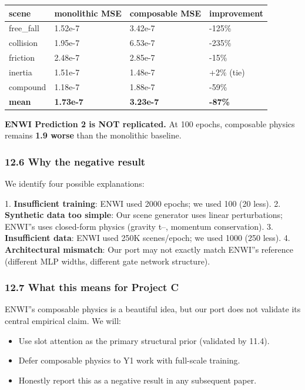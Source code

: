 \documentclass[11pt]{article}
\begin{document}
\begin{tabular}{llll}
scene & monolithic MSE & composable MSE & improvement \\
\hline
free\_fall & 1.52e-7 & 3.42e-7 & -125\% \\
collision & 1.95e-7 & 6.53e-7 & -235\% \\
friction & 2.48e-7 & 2.85e-7 & -15\% \\
inertia & 1.51e-7 & 1.48e-7 & +2\% (tie) \\
compound & 1.18e-7 & 1.88e-7 & -59\% \\
\textbf{mean} & \textbf{1.73e-7} & \textbf{3.23e-7} & \textbf{-87\%} \\
\end{tabular}


\textbf{ENWI Prediction 2 is NOT replicated.} At 100 epochs, composable physics
remains \textbf{1.9 worse} than the monolithic baseline.

\subsubsection{12.6 Why the negative result}

We identify four possible explanations:

1. \textbf{Insufficient training}: ENWI used 2000 epochs; we used 100 (20 less).
2. \textbf{Synthetic data too simple}: Our scene generator uses linear perturbations;
   ENWI''s uses closed-form physics (gravity t--, momentum conservation).
3. \textbf{Insufficient data}: ENWI used 250K scenes/epoch; we used 1000 (250 less).
4. \textbf{Architectural mismatch}: Our port may not exactly match ENWI''s reference
   (different MLP widths, different gate network structure).

\subsubsection{12.7 What this means for Project C}

ENWI''s composable physics is a beautiful idea, but our port does not validate
its central empirical claim. We will:

\begin{itemize}
  \item Use slot attention as the primary structural prior (validated by 11.4).
  \item Defer composable physics to Y1 work with full-scale training.
  \item Honestly report this as a negative result in any subsequent paper.
\end{itemize}
\end{document}
